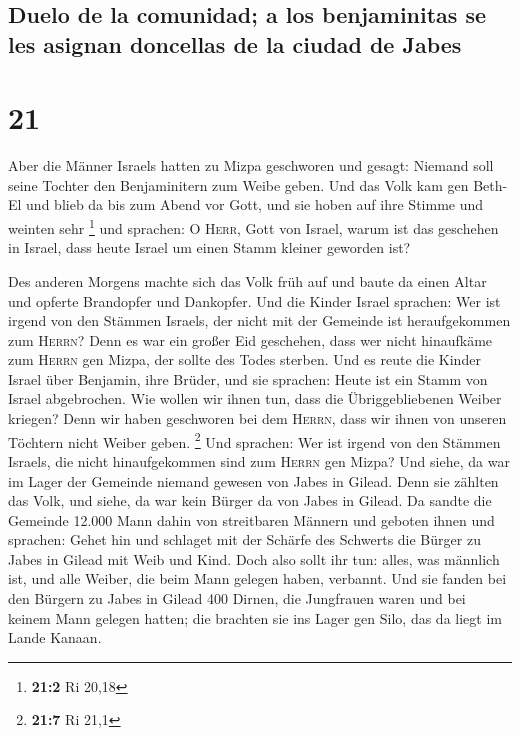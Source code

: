 \hypertarget{duelo-de-la-comunidad-a-los-benjaminitas-se-les-asignan-doncellas-de-la-ciudad-de-jabes}{%
\subsection{Duelo de la comunidad; a los benjaminitas se les asignan
doncellas de la ciudad de
Jabes}\label{duelo-de-la-comunidad-a-los-benjaminitas-se-les-asignan-doncellas-de-la-ciudad-de-jabes}}

\hypertarget{section-20}{%
\section{21}\label{section-20}}

 Aber die Männer Israels hatten zu Mizpa geschworen und
gesagt: Niemand soll seine Tochter den Benjaminitern zum Weibe geben.
 Und das Volk kam gen Beth-El und blieb da bis zum Abend
vor Gott, und sie hoben auf ihre Stimme und weinten sehr \footnote{\textbf{21:2}
  Ri 20,18}  und sprachen: O \textsc{Herr}, Gott von
Israel, warum ist das geschehen in Israel, dass heute Israel um einen
Stamm kleiner geworden ist?

 Des anderen Morgens machte sich das Volk früh auf und
baute da einen Altar und opferte Brandopfer und Dankopfer.
 Und die Kinder Israel sprachen: Wer ist irgend von den
Stämmen Israels, der nicht mit der Gemeinde ist heraufgekommen zum
\textsc{Herrn}? Denn es war ein großer Eid geschehen, dass wer nicht
hinaufkäme zum \textsc{Herrn} gen Mizpa, der sollte des Todes sterben.
 Und es reute die Kinder Israel über Benjamin, ihre
Brüder, und sie sprachen: Heute ist ein Stamm von Israel abgebrochen.
 Wie wollen wir ihnen tun, dass die Übriggebliebenen
Weiber kriegen? Denn wir haben geschworen bei dem \textsc{Herrn}, dass
wir ihnen von unseren Töchtern nicht Weiber geben. \footnote{\textbf{21:7}
  Ri 21,1}  Und sprachen: Wer ist irgend von den Stämmen
Israels, die nicht hinaufgekommen sind zum \textsc{Herrn} gen Mizpa? Und
siehe, da war im Lager der Gemeinde niemand gewesen von Jabes in Gilead.
 Denn sie zählten das Volk, und siehe, da war kein Bürger
da von Jabes in Gilead.  Da sandte die Gemeinde 12.000
Mann dahin von streitbaren Männern und geboten ihnen und sprachen: Gehet
hin und schlaget mit der Schärfe des Schwerts die Bürger zu Jabes in
Gilead mit Weib und Kind.  Doch also sollt ihr tun:
alles, was männlich ist, und alle Weiber, die beim Mann gelegen haben,
verbannt.  Und sie fanden bei den Bürgern zu Jabes in
Gilead 400 Dirnen, die Jungfrauen waren und bei keinem Mann gelegen
hatten; die brachten sie ins Lager gen Silo, das da liegt im Lande
Kanaan.

